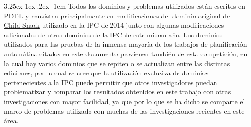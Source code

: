 \documentclass{article}
\makeatletter
\renewcommand\paragraph{\@startsection{paragraph}{5}{\z@}%
  {3.25ex \@plus1ex \@minus.2ex}%
  {-1em}%
  {\normalfont\normalsize\bfseries}}
\makeatother
\begin{document}
\paragraph{}
Todos los dominios y problemas utilizados están escritos en PDDL y consisten principalmente en modificaciones del dominio original de \href{https://helios.hud.ac.uk/scommv/IPC-14/repository/benchmarksV1.1.zip}{Child-Snack} utilizado en la IPC de 2014\cite{ipc2014} junto con algunas modificaciones adicionales de otros dominios de la IPC de este mismo año. Los dominios utilizados para las pruebas de la inmensa mayoría de los trabajos de planificación automática citados en este documento provienen también de esta competición, en la cual hay varios dominios que se repiten o se actualizan entre las distintas ediciones, por lo cual se cree que la utilización exclusiva de dominios pertenecientes a la IPC puede permitir que otros investigadores puedan problematizar y comparar los resultados obtenidos en este trabajo con otras investigaciones con mayor facilidad, ya que por lo que se ha dicho se comparte el marco de problemas utilizado con muchas de las investigaciones recientes en este área.



\medskip

%
%
\end{document}
